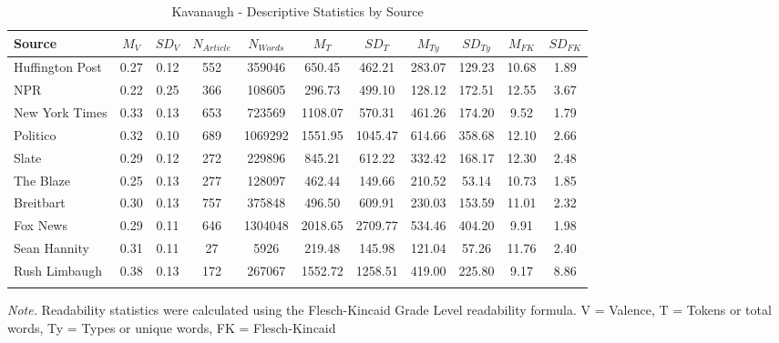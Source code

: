 \documentclass[
  man,floatsintext]{apa6}
\begin{document}
\begin{table}[h]

\begin{center}
\begin{threeparttable}

\caption{\label{tab:exp2-source-descriptives-kav}Kavanaugh - Descriptive Statistics by Source}

\footnotesize{

\begin{tabular}{lcccccccccc}
\toprule
Source & $M_V$ & $SD_V$ & $N_{Article}$ & $N_{Words}$ & $M_T$ & $SD_T$ & $M_{Ty}$ & $SD_{Ty}$ & $M_{FK}$ & $SD_{FK}$\\
\midrule
Huffington Post & 0.27 & 0.12 & 552 & 359046 & 650.45 & 462.21 & 283.07 & 129.23 & 10.68 & 1.89\\
NPR & 0.22 & 0.25 & 366 & 108605 & 296.73 & 499.10 & 128.12 & 172.51 & 12.55 & 3.67\\
New York Times & 0.33 & 0.13 & 653 & 723569 & 1108.07 & 570.31 & 461.26 & 174.20 & 9.52 & 1.79\\
Politico & 0.32 & 0.10 & 689 & 1069292 & 1551.95 & 1045.47 & 614.66 & 358.68 & 12.10 & 2.66\\
Slate & 0.29 & 0.12 & 272 & 229896 & 845.21 & 612.22 & 332.42 & 168.17 & 12.30 & 2.48\\
The Blaze & 0.25 & 0.13 & 277 & 128097 & 462.44 & 149.66 & 210.52 & 53.14 & 10.73 & 1.85\\
Breitbart & 0.30 & 0.13 & 757 & 375848 & 496.50 & 609.91 & 230.03 & 153.59 & 11.01 & 2.32\\
Fox News & 0.29 & 0.11 & 646 & 1304048 & 2018.65 & 2709.77 & 534.46 & 404.20 & 9.91 & 1.98\\
Sean Hannity & 0.31 & 0.11 & 27 & 5926 & 219.48 & 145.98 & 121.04 & 57.26 & 11.76 & 2.40\\
Rush Limbaugh & 0.38 & 0.13 & 172 & 267067 & 1552.72 & 1258.51 & 419.00 & 225.80 & 9.17 & 8.86\\
\bottomrule
\addlinespace
\end{tabular}

}

\begin{tablenotes}[para]
\normalsize{\textit{Note.} Readability statistics were calculated using the Flesch-Kincaid Grade Level readability formula. V = Valence, T = Tokens or total words, Ty = Types or unique words, FK = Flesch-Kincaid}
\end{tablenotes}

\end{threeparttable}
\end{center}

\end{table}
\end{document}
